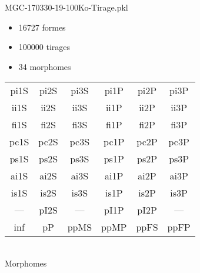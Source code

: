 MGC-170330-19-100Ko-Tirage.pkl
\begin{itemize}
\item 16727 formes
\item 100000 tirages
\item 34 morphomes
\end{itemize}
\begin{center}
\begin{tabular}{cccccc}
\hline
\cellcolor{white}pi1S & \cellcolor{orange}pi2S & \cellcolor{orange}pi3S & \cellcolor{white}pi1P & \cellcolor{white}pi2P & \cellcolor{white}pi3P\\
\cellcolor{brown}ii1S & \cellcolor{brown}ii2S & \cellcolor{brown}ii3S & \cellcolor{white}ii1P & \cellcolor{white}ii2P & \cellcolor{brown}ii3P\\
\cellcolor{yellow}fi1S & \cellcolor{lime}fi2S & \cellcolor{lime}fi3S & \cellcolor{white}fi1P & \cellcolor{white}fi2P & \cellcolor{white}fi3P\\
\cellcolor{yellow}pc1S & \cellcolor{yellow}pc2S & \cellcolor{yellow}pc3S & \cellcolor{white}pc1P & \cellcolor{white}pc2P & \cellcolor{yellow}pc3P\\
\cellcolor{teal}ps1S & \cellcolor{teal}ps2S & \cellcolor{teal}ps3S & \cellcolor{white}ps1P & \cellcolor{white}ps2P & \cellcolor{teal}ps3P\\
\cellcolor{white}ai1S & \cellcolor{lightgray}ai2S & \cellcolor{lightgray}ai3S & \cellcolor{white}ai1P & \cellcolor{blue}ai2P & \cellcolor{white}ai3P\\
\cellcolor{pink}is1S & \cellcolor{white}is2S & \cellcolor{lightgray}is3S & \cellcolor{white}is1P & \cellcolor{black}is2P & \cellcolor{pink}is3P\\
--- & \cellcolor{white}pI2S & --- & \cellcolor{white}pI1P & \cellcolor{blue}pI2P & ---\\
\cellcolor{white}inf & \cellcolor{white}pP & \cellcolor{white}ppMS & \cellcolor{white}ppMP & \cellcolor{white}ppFS & \cellcolor{white}ppFP\\
\hline
\end{tabular}\\
Morphomes
\end{center}
\bigskip
